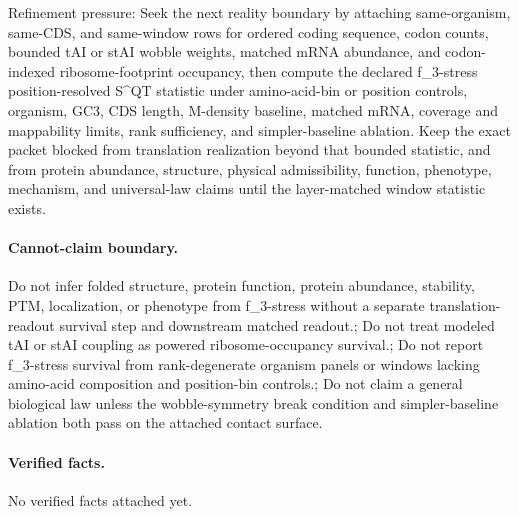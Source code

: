 Refinement pressure: Seek the next reality boundary by attaching same-organism, same-CDS, and same-window rows for ordered coding sequence, codon counts, bounded tAI or stAI wobble weights, matched mRNA abundance, and codon-indexed ribosome-footprint occupancy, then compute the declared f\_3-stress position-resolved S\textasciicircum{}QT statistic under amino-acid-bin or position controls, organism, GC3, CDS length, M-density baseline, matched mRNA, coverage and mappability limits, rank sufficiency, and simpler-baseline ablation. Keep the exact packet blocked from translation realization beyond that bounded statistic, and from protein abundance, structure, physical admissibility, function, phenotype, mechanism, and universal-law claims until the layer-matched window statistic exists.

\paragraph{Cannot-claim boundary.} Do not infer folded structure, protein function, protein abundance, stability, PTM, localization, or phenotype from f\_3-stress without a separate translation-readout survival step and downstream matched readout.; Do not treat modeled tAI or stAI coupling as powered ribosome-occupancy survival.; Do not report f\_3-stress survival from rank-degenerate organism panels or windows lacking amino-acid composition and position-bin controls.; Do not claim a general biological law unless the wobble-symmetry break condition and simpler-baseline ablation both pass on the attached contact surface.

\paragraph{Verified facts.}
No verified facts attached yet.
